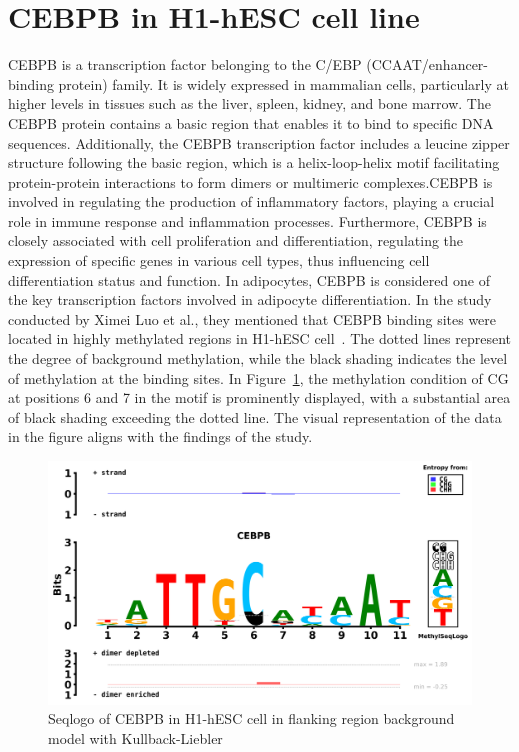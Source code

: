 \documentclass{PHlab-thesis}
\begin{document}
\section{CEBPB in H1-hESC cell line}
CEBPB is a transcription factor belonging to the C/EBP (CCAAT/enhancer-binding protein) family. It is widely expressed in mammalian cells, particularly at higher levels in tissues such as the liver, spleen, kidney, and bone marrow. The CEBPB protein contains a basic region that enables it to bind to specific DNA sequences. Additionally, the CEBPB transcription factor includes a leucine zipper structure following the basic region, which is a helix-loop-helix motif facilitating protein-protein interactions to form dimers or multimeric complexes.CEBPB is involved in regulating the production of inflammatory factors, playing a crucial role in immune response and inflammation processes. Furthermore, CEBPB is closely associated with cell proliferation and differentiation, regulating the expression of specific genes in various cell types, thus influencing cell differentiation status and function. In adipocytes, CEBPB is considered one of the key transcription factors involved in adipocyte differentiation. In the study conducted by Ximei Luo et al., they mentioned that CEBPB binding sites were located in highly methylated regions in H1-hESC cell~\cite{luo2021effects}. The dotted lines represent the degree of background methylation, while the black shading indicates the level of methylation at the binding sites. In Figure~\ref{fig:CEBPBFlanking}, the methylation condition of CG at positions 6 and 7 in the motif is prominently displayed, with a substantial area of black shading exceeding the dotted line. The visual representation of the data in the figure aligns with the findings of the study.
\begin{figure}[H]
	\centering
	\includegraphics[scale=0.55]{figures/yulingCEBPB_human_H1-hESC_50_Methyl_Kullback-Liebler_seqlogo.png}
	\caption{Seqlogo of CEBPB in H1-hESC cell in flanking region background model with Kullback-Liebler}
	\label{fig:CEBPBFlanking} 
\end{figure}
\end{document}

